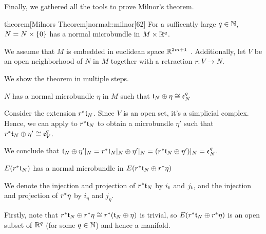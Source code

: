 \begin{scope}
    \newcommand{\rwhitney} {
        \whitney{\ind{r}\bt_N}{\ind{r}\eta}
    }
    \newcommand{\rtn} {
        \ind{r}\bt_N
    }

    \begin{myparagraph}
        Finally, we gathered all the tools to prove Milnor's theorem.
    \end{myparagraph}

    \begin{mystatement}{theorem}[Milnors Theorem]{normal::milnor}[62]
        For a sufficently large $q \in \N$, $N = \cyldown{N}$ has a normal microbundle in $M \cross \R^q$.
    \end{mystatement}

    \begin{myproof}
        We assume that $M$ is embedded in euclidean space $\R^{2m + 1}$ \cite[p.60]{dimension}.
        Additionally, let $V$ be an open neighborhood of $N$ in $M$ together with a retraction $r: V \to N$.

        We show the theorem in multiple steps.
        \begin{steps}
            \item $N$ has a normal microbundle $\eta$ in $M$ such that $\whitney{\bt_N}{\eta} \cong \be[q]{N}$
            
            Consider the extension $\ind{r}\bt_N$.
            Since $V$ is an open set, it's a simplicial complex.
            Hence, we can apply  to $\ind{r}\bt_N$
            to obtain a microbundle $\eta'$ such that $\whitney{\ind{r}\bt_N}{\eta'} \cong \be[q]{V}$.

            We conclude that $\whitney{\bt_N}{\eta'\restr{N}} = \whitney{\ind{r}\bt_N\restr{N}}{\eta'\restr{N}} = (\whitney{\ind{r}\bt_N}{\eta'})\restr{N} = \be[q]{N}$.

            \item $E(\rtn)$ has a normal microbundle in $E(\rwhitney)$

            We denote the injection and projection of $\rtn$ by $i_{\bt}$ and $j_{\bt}$,
            and the injection and projection of $\ind{r}\eta$ by $i_{\eta}$ and $j_{\eta}$.

            Firstly, note that $\rwhitney \cong \ind{r}(\whitney{\bt_N}{\eta})$ is trivial, so
            $E(\rwhitney)$ is an open subset of $\R^q$ (for some $q \in \N$) and hence a manifold.


\end{steps}
\end{myproof}
\end{scope}
